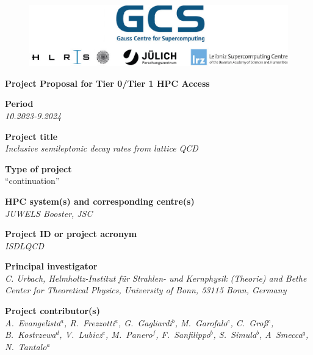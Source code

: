 \documentclass [a4paper, 11pt]{article}
\begin{document}
 
\begin{figure}[H]
\begin{center}
  \includegraphics[scale=0.45]{Figures/GCS-hlrs-fzj-lrz.jpg}\\
\end{center}
\end{figure}

\begin{center}
{\LARGE \bf Project Proposal for Tier 0/Tier 1 HPC Access} \\

\bigskip
\bigskip
\bigskip
\end{center}
\textbf{Period}\\
\phantom{MM}\textit{10.2023-9.2024}

\bigskip
\textbf{Project title}\\
\phantom{MM}\textit{Inclusive semileptonic decay rates from lattice QCD}

\bigskip
\textbf{Type of project}\\
\phantom{MM} ``continuation''

\bigskip
\textbf{HPC system(s) and corresponding centre(s)}\\
\phantom{MM} \textit{JUWELS Booster, JSC}

\bigskip
\textbf{Project ID or project acronym}\\
\phantom{MM} \textit{ISDLQCD}%

\bigskip
\textbf{Principal investigator}\\
\phantom{MM} \textit{C. Urbach, Helmholtz-Institut für Strahlen- und Kernphysik (Theorie) and
	Bethe Center for Theoretical Physics, University of Bonn, 53115 Bonn, Germany}

\bigskip
\textbf{Project contributor(s)}\\
\phantom{MM} \textit{ 
 A.~Evangelista$^a$,
 R.~Frezzotti$^a$,
 G.~Gagliardi$^b$,
 M.~Garofalo$^c$,
 C.~Groß$^c$,
 B.~Kostrzewa$^d$,
 V.~Lubicz$^e$,
 M.~Panero$^f$,
 F.~Sanfilippo$^b$,
 S.~Simula$^b$,
 A~Smecca$^g$,
 N.~Tantalo$^a$
}\\ 
\end{document}
